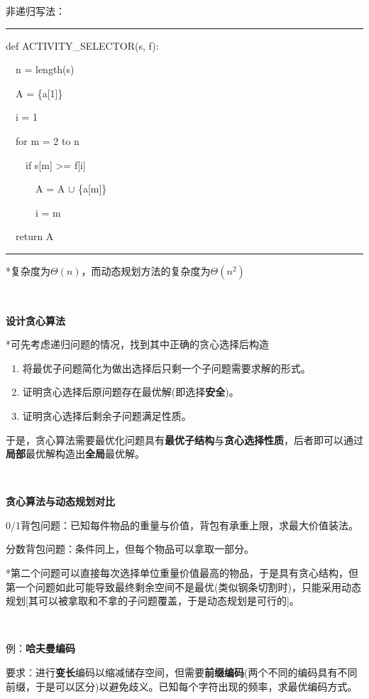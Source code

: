 \documentclass[a4paper,UTF8,fontset=windows]{ctexart}
\newenvironment{code}{\rule{36em}{0.1em}\setlength{\parindent}{1em}

}{

\setlength{\parindent}{0em}\rule{36em}{0.1em}}
\begin{document}
非递归写法：

\begin{code}
def ACTIVITY\_SELECTOR(s, f):

\ \ n = length(s)

\ \ A = \{a[1]\}

\ \ i = 1

\ \ for m = 2 to n

\ \ \ \ if s[m] >= f[i]

\ \ \ \ \ \ A = A $\cup$ \{a[m]\}

\ \ \ \ \ \ i = m

\ \ return A
\end{code}

*\hspace{0em}复杂度为$\Theta(n)$，而动态规划方法的复杂度为$\Theta(n^2)$

\

\textbf{设计贪心算法}

*\hspace{0em}可先考虑递归问题的情况，找到其中正确的贪心选择后构造

\begin{enumerate}
\item 
将最优子问题简化为做出选择后只剩一个子问题需要求解的形式。

\item
证明贪心选择后原问题存在最优解(即选择\textbf{安全})。

\item
证明贪心选择后剩余子问题满足性质。
\end{enumerate}

于是，贪心算法需要最优化问题具有\textbf{最优子结构}与\textbf{贪心选择性质}，后者即可以通过\textbf{局部}最优解构造出\textbf{全局}最优解。

\

\textbf{贪心算法与动态规划对比}

0/1背包问题：已知每件物品的重量与价值，背包有承重上限，求最大价值装法。

分数背包问题：条件同上，但每个物品可以拿取一部分。

*\hspace{0em}第二个问题可以直接每次选择单位重量价值最高的物品，于是具有贪心结构，但第一个问题如此可能导致最终剩余空间不是最优(类似钢条切割时)，只能采用动态规划[其可以被拿取和不拿的子问题覆盖，于是动态规划是可行的]。

\

例：\textbf{哈夫曼编码}

要求：进行\textbf{变长}编码以缩减储存空间，但需要\textbf{前缀编码}(两个不同的编码具有不同前缀，于是可以区分)以避免歧义。已知每个字符出现的频率，求最优编码方式。
\end{document}

